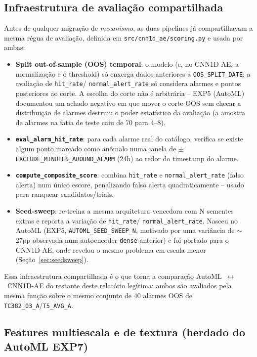 \documentclass[11pt,a4paper]{article}
\begin{document}
\subsection{Infraestrutura de avaliação compartilhada}

Antes de qualquer migração de \emph{mecanismo}, as duas pipelines já
compartilhavam a mesma régua de avaliação, definida em
\texttt{src/cnn1d\_ae/scoring.py} e usada por ambas:

\begin{itemize}[leftmargin=1.4em]
  \item \textbf{Split out-of-sample (OOS) temporal}: o modelo (e, no
    CNN1D-AE, a normalização e o threshold) só enxerga dados anteriores
    a \texttt{OOS\_SPLIT\_DATE}; a avaliação de \texttt{hit\_rate}/
    \texttt{normal\_alert\_rate} só considera alarmes e pontos
    posteriores ao corte. A escolha do corte não é arbitrária --
    EXP5 (AutoML) documentou um achado negativo em que mover o corte
    OOS sem checar a distribuição de alarmes destruiu o poder
    estatístico da avaliação (a amostra de alarmes na fatia de teste
    caiu de 70 para 4--8).
  \item \textbf{\texttt{eval\_alarm\_hit\_rate}}: para cada alarme real
    do catálogo, verifica se existe algum ponto marcado como anômalo
    numa janela de $\pm$\texttt{EXCLUDE\_MINUTES\_AROUND\_ALARM}
    (24h) ao redor do timestamp do alarme.
  \item \textbf{\texttt{compute\_composite\_score}}: combina
    \texttt{hit\_rate} e \texttt{normal\_alert\_rate} (falso alerta) num
    único escore, penalizando falso alerta quadraticamente -- usado
    para ranquear candidatos/trials.
  \item \textbf{Seed-sweep}: re-treina a mesma arquitetura vencedora com
    N sementes extras e reporta a variação de \texttt{hit\_rate}/
    \texttt{normal\_alert\_rate}. Nasceu no AutoML (EXP5,
    \texttt{AUTOML\_SEED\_SWEEP\_N}, motivado por uma variância de
    $\sim$27pp observada num autoencoder \texttt{dense} anterior) e foi
    portado para o CNN1D-AE, onde revelou o mesmo problema em escala
    menor (Seção~\ref{sec:seedsweep}).
\end{itemize}

Essa infraestrutura compartilhada é o que torna a comparação
AutoML~$\leftrightarrow$~CNN1D-AE do restante deste relatório
legítima: ambos são avaliados pela mesma função sobre o mesmo conjunto
de 40 alarmes OOS de \texttt{TC382\_03\_A}/\texttt{T5\_AVG\_A}.

\subsection{Features multiescala e de textura (herdado do AutoML EXP7)}
\label{sec:multiescala}
\end{document}
